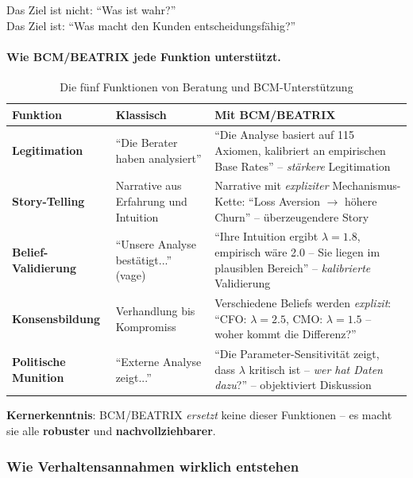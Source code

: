 Das Ziel ist nicht: ``Was ist wahr?''\\
Das Ziel ist: ``Was macht den Kunden entscheidungsfähig?''

\paragraph{Wie BCM/BEATRIX jede Funktion unterstützt.}

\begin{table}[h]
\centering
\caption{Die fünf Funktionen von Beratung und BCM-Unterstützung}
\small
\begin{tabular}{@{}p{2.5cm}p{4.5cm}p{5.5cm}@{}}
\toprule
\textbf{Funktion} & \textbf{Klassisch} & \textbf{Mit BCM/BEATRIX} \\
\midrule
\textbf{Legitimation} &
``Die Berater haben analysiert'' &
``Die Analyse basiert auf 115 Axiomen, kalibriert an empirischen Base Rates'' -- \textit{stärkere} Legitimation \\[0.5em]

\textbf{Story-Telling} &
Narrative aus Erfahrung und Intuition &
Narrative mit \textit{expliziter} Mechanismus-Kette: ``Loss Aversion $\rightarrow$ höhere Churn'' -- überzeugendere Story \\[0.5em]

\textbf{Belief-Validierung} &
``Unsere Analyse bestätigt...'' (vage) &
``Ihre Intuition ergibt $\lambda = 1.8$, empirisch wäre 2.0 -- Sie liegen im plausiblen Bereich'' -- \textit{kalibrierte} Validierung \\[0.5em]

\textbf{Konsensbildung} &
Verhandlung bis Kompromiss &
Verschiedene Beliefs werden \textit{explizit}: ``CFO: $\lambda = 2.5$, CMO: $\lambda = 1.5$ -- woher kommt die Differenz?'' \\[0.5em]

\textbf{Politische Munition} &
``Externe Analyse zeigt...'' &
``Die Parameter-Sensitivität zeigt, dass $\lambda$ kritisch ist -- \textit{wer hat Daten dazu}?'' -- objektiviert Diskussion \\
\bottomrule
\end{tabular}
\end{table}

\textbf{Kernerkenntnis}: BCM/BEATRIX \textit{ersetzt} keine dieser Funktionen -- es macht sie alle \textbf{robuster} und \textbf{nachvollziehbarer}.

\subsubsection{Wie Verhaltensannahmen wirklich entstehen}

